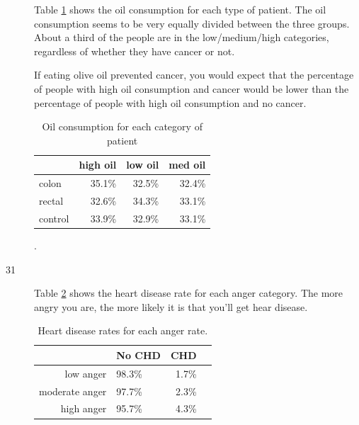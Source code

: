 \documentclass[letterpaper, landscape]{exam}
\begin{document}
\begin{description}
      Table \ref{tab:ex30b} shows the oil consumption for each type of patient.
      The oil consumption seems to be very equally divided between the three
      groups.  About a third of the people are in the low/medium/high
      categories, regardless of whether they have cancer or not.

      If eating olive oil prevented cancer, you would expect that the percentage
      of people with high oil consumption and cancer would be lower than the
      percentage of people with high oil consumption and no cancer.

      \begin{table}[H]
        \centering
        \begin{tabular}{lrrr}
          \toprule
                  & high oil & low oil & med oil \\
          \midrule
          colon   & 35.1\%   & 32.5\%  & 32.4\% \\
          rectal  & 32.6\%   & 34.3\%  & 33.1\% \\
          control & 33.9\%   & 32.9\%  & 33.1\% \\
          \bottomrule
        \end{tabular}
        \caption{Oil consumption for each category of patient}.
        \label{tab:ex30b}
      \end{table}


    \item[31]
      Table \ref{tab:ex31} shows the heart disease rate for each anger category.
      The more angry you are, the more likely it is that you'll get hear
      disease.

      \begin{table}[H]
        \centering
        \begin{tabular}{rlrr}
          \toprule
                         & No CHD   & CHD \\
          \midrule
          low anger      & 98.3\%   & 1.7\% \\
          moderate anger & 97.7\%   & 2.3\% \\
          high anger     & 95.7\%   & 4.3\% \\
          \bottomrule
        \end{tabular}
        \caption{Heart disease rates for each anger rate.}
        \label{tab:ex31}
      \end{table}

  \end{description}
\end{document}
